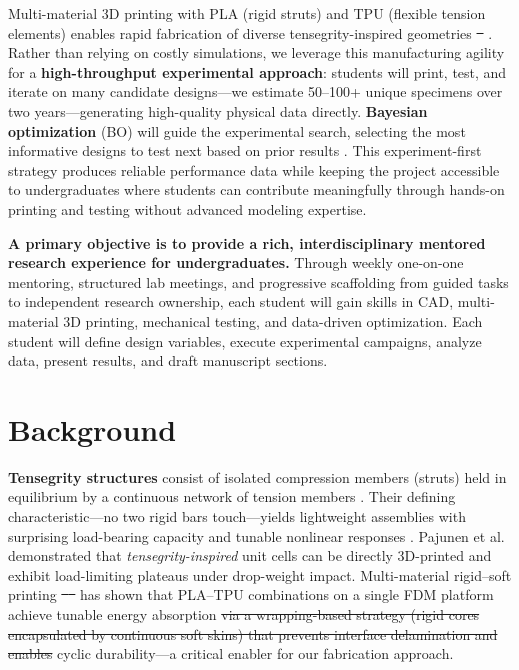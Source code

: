 \documentclass[11pt]{article}
\providecommand{\DIFaddtex}[1]{{\protect\color{blue}\uwave{#1}}} %
\providecommand{\DIFdeltex}[1]{{\protect\color{red}\sout{#1}}}                      %
\providecommand{\DIFaddbegin}{} %
\providecommand{\DIFaddend}{} %
\providecommand{\DIFdelbegin}{} %
\providecommand{\DIFdelend}{} %
\providecommand{\DIFadd}[1]{\texorpdfstring{\DIFaddtex{#1}}{#1}} %
\providecommand{\DIFdel}[1]{\texorpdfstring{\DIFdeltex{#1}}{}} %
\newcommand{\DIFscaledelfig}{0.5}
\newlength{\DIFdelgraphicswidth} %
\newlength{\DIFdelgraphicsheight} %
\newcommand{\DIFaddincludegraphics}[2][]{{\color{blue}\fbox{\DIFOincludegraphics[#1]{#2}}}} %
\newcommand{\DIFdelincludegraphics}[2][]{%
\sbox{\DIFdelgraphicsbox}{\DIFOincludegraphics[#1]{#2}}%
\settoboxwidth{\DIFdelgraphicswidth}{\DIFdelgraphicsbox} %
\settoboxtotalheight{\DIFdelgraphicsheight}{\DIFdelgraphicsbox} %
\scalebox{\DIFscaledelfig}{%
\parbox[b]{\DIFdelgraphicswidth}{\usebox{\DIFdelgraphicsbox}\\[-\baselineskip] \rule{\DIFdelgraphicswidth}{0em}}\llap{\resizebox{\DIFdelgraphicswidth}{\DIFdelgraphicsheight}{%
\setlength{\unitlength}{\DIFdelgraphicswidth}%
\begin{picture}(1,1)%
\thicklines\linethickness{2pt} %
{\color[rgb]{1,0,0}\put(0,0){\framebox(1,1){}}}%
{\color[rgb]{1,0,0}\put(0,0){\line( 1,1){1}}}%
{\color[rgb]{1,0,0}\put(0,1){\line(1,-1){1}}}%
\end{picture}%
}\hspace*{3pt}}} %
} %
\DeclareRobustCommand{\DIFaddbegin}{\DIFOaddbegin \let\includegraphics\DIFaddincludegraphics} %
\DeclareRobustCommand{\DIFaddend}{\DIFOaddend \let\includegraphics\DIFOincludegraphics} %
\DeclareRobustCommand{\DIFdelbegin}{\DIFOdelbegin \let\includegraphics\DIFdelincludegraphics} %
\DeclareRobustCommand{\DIFdelend}{\DIFOaddend \let\includegraphics\DIFOincludegraphics} %
\begin{document}
Multi-material 3D printing with PLA (rigid struts) and TPU (flexible tension
elements) enables rapid fabrication of diverse tensegrity-inspired geometries
\DIFdelbegin \DIFdel{\mbox{%
\citep{ye2023multimaterial, khatri2024energy}}\hskip0pt%
}\DIFdelend \DIFaddbegin \DIFadd{\mbox{%
\citep{khatri2024energy}}\hskip0pt%
}\DIFaddend .  Rather
than relying on costly simulations, we leverage this manufacturing
agility for a \textbf{high-throughput experimental approach}: students
will print, test, and iterate on many candidate designs---we estimate 50--100+
unique specimens over two years---generating high-quality physical data
directly.  \textbf{Bayesian optimization} (BO) will guide the experimental
search, selecting the most informative designs to test next based on
prior results \citep{shahriari2016taking, frazier2018tutorial}.  This
experiment-first strategy produces reliable performance data while
keeping the project accessible to undergraduates where students can
contribute meaningfully through hands-on printing and testing without
advanced modeling expertise.

\textbf{A primary objective is to provide a rich,
interdisciplinary mentored research experience for undergraduates.}  Through
weekly one-on-one mentoring, structured lab meetings, and progressive
scaffolding from guided tasks to independent research
ownership, each student will gain skills in CAD, multi-material 3D
printing, mechanical testing, and data-driven optimization. Each student will define design variables, execute experimental campaigns, analyze data, present results, and draft manuscript sections.

\section{Background}

\textbf{Tensegrity structures} consist of isolated compression members (struts)
held in equilibrium by a continuous network of tension members
\citep{skelton2009tensegrity, sultan2009tensegrity}.  Their defining
characteristic---no two rigid bars touch---yields lightweight assemblies with
surprising load-bearing capacity and tunable nonlinear responses
\citep{amendola2014experimental, zhang2018tensegrity}.
Pajunen et al.\ \citep{pajunen2019design} demonstrated that
\emph{tensegrity-inspired} unit cells can be directly 3D-printed and exhibit
load-limiting plateaus under drop-weight impact.
Multi-material rigid--soft printing
\DIFdelbegin \DIFdel{\mbox{%
\citep{ye2023multimaterial, khatri2024energy} }\hskip0pt%
}\DIFdelend \DIFaddbegin \DIFadd{\mbox{%
\citep{khatri2024energy} }\hskip0pt%
}\DIFaddend has shown that PLA--TPU
combinations on a single FDM platform achieve tunable energy
absorption \DIFdelbegin \DIFdel{via a wrapping-based strategy (rigid cores
encapsulated by continuous soft skins) that prevents interface delamination and enables }\DIFdelend \DIFaddbegin \DIFadd{and }\DIFaddend cyclic durability---a critical enabler for our fabrication approach.
\end{document}
